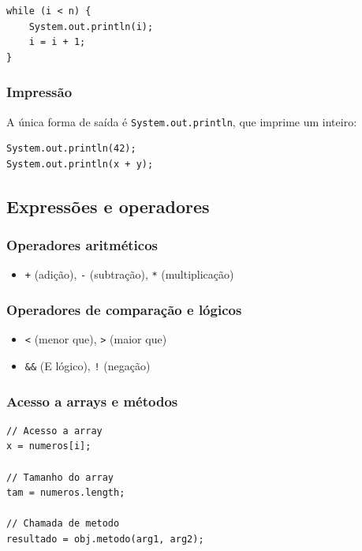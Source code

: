 \documentclass[a4paper, 12pt]{article}
\begin{document}
\begin{lstlisting}[style=minijava, caption={La\c{c}o while}]
while (i < n) {
    System.out.println(i);
    i = i + 1;
}
\end{lstlisting}

\subsubsection{Impress\~ao}

A \'unica forma de sa\'ida \'e \texttt{System.out.println}, que imprime um inteiro:

\begin{lstlisting}[style=minijava, caption={Impress\~ao de valores}]
System.out.println(42);
System.out.println(x + y);
\end{lstlisting}

\subsection{Express\~oes e operadores}

\subsubsection{Operadores aritm\'eticos}

\begin{itemize}
    \item \texttt{+} (adi\c{c}\~ao), \texttt{-} (subtra\c{c}\~ao), \texttt{*} (multiplica\c{c}\~ao)
\end{itemize}

\subsubsection{Operadores de compara\c{c}\~ao e l\'ogicos}

\begin{itemize}
    \item \texttt{<} (menor que), \texttt{>} (maior que)
    \item \texttt{\&\&} (E l\'ogico), \texttt{!} (nega\c{c}\~ao)
\end{itemize}

\subsubsection{Acesso a arrays e m\'etodos}

\begin{lstlisting}[style=minijava, caption={Express\~oes com arrays e m\'etodos}]
// Acesso a array
x = numeros[i];

// Tamanho do array
tam = numeros.length;

// Chamada de metodo
resultado = obj.metodo(arg1, arg2);
\end{lstlisting}
\end{document}
